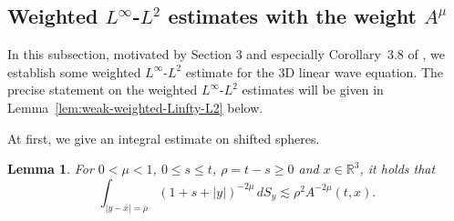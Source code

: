 \documentclass[11pt,twoside]{article}
\def\ls{\lesssim}
\theoremstyle{plain}
\newtheorem{lemma}[theorem]{Lemma}
\theoremstyle{definition}
\theoremstyle{assumption}
\numberwithin{equation}{section}
\begin{document}
	
	
	
	
	
	
	\subsection{Weighted $L^\infty$-$L^2$ estimates with the weight $A^{\mu}$}\label{subsec:weighted-linear-Linfty-L2-estimate-1}
			
In this subsection, motivated by Section 3 and especially Corollary~3.8 of \cite{GaoLiYin2026}, we establish some weighted \(L^\infty\)-\(L^2\) estimate for the 3D linear wave equation.  The precise statement on the  weighted $L^\infty$-$L^2$ estimates
will be given in Lemma~\ref{lem:weak-weighted-Linfty-L2} below.

At first, we give an integral estimate on shifted spheres.
			\begin{lemma}\label{lem:weak-geom-sphere}
				For \(0<\mu<1\), \(0\le s\le t\), \(\rho=t-s\ge0\) and
				\(x\in\mathbb R^3\), it holds that
				\begin{equation}\label{eq:weak-geom-sphere-surface}
				\int_{|y-x|=\rho}
				(1+s+|y|)^{-2\mu}\,dS_y
				\ls
				\rho^2 A^{-2\mu}(t,x).
				\end{equation}
			\end{lemma}
			
\end{document}
